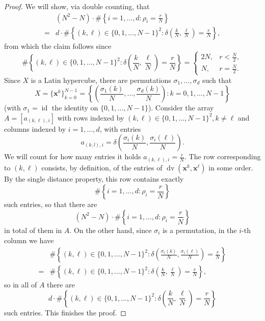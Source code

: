 \documentclass[a4paper,12pt]{article}
\numberwithin{equation}{section}
\theoremstyle{definition}
\newcommand{\bx}{\mathbf{x}}
\newcommand{\dv}{\operatorname{dv}}
\newcommand{\id}{\operatorname{id}}
\begin{document}
\begin{proof}
    We will show, via double counting, that
    \begin{align*}
        & (N^2-N) \cdot \#\left\{i=1, \dots, d: \rho_i = \frac rN\right\} \\
        = & d \cdot \#\left\{(k, \ell) \in \{0, 1, \dots, N-1\}^2: \delta\left(\frac kN, \frac \ell N\right) = \frac rN\right\},
    \end{align*}
    from which the claim follows since
    $$
    \#\left\{(k, \ell) \in \{0, 1, \dots, N-1\}^2: \delta\left(\frac kN, \frac \ell N\right) = \frac rN\right\} = \begin{cases}
        2N, &  r < \frac N2, \\
        N ,&  r = \frac N2.
    \end{cases}
    $$
    Since $X$ is a Latin hypercube, there are permutations $\sigma_1, \dots, \sigma_d$ %
    such that %
    $$
    X = \{\bx^k\}_{k=0}^{N-1} = \left\{\left(\frac{\sigma_1(k)}N, \dots, \frac{\sigma_d(k)}N\right): k=0, 1, \dots, N-1\right\}
    $$
    (with $\sigma_1 = \id$ the identity on $\{0, 1, \dots, N-1\}$). Consider the array $A = [a_{(k, \ell), i}]$ with rows indexed by $(k, \ell) \in \{0, 1, \dots, N-1\}^2, k \neq \ell$ and columns indexed by $i=1, \dots, d$, with entries
    $$
    a_{(k, l), i} = \delta\left(\frac{\sigma_i(k)}N, \frac{\sigma_i(\ell)}N\right).
    $$
    We will count for how many entries it holds $a_{(k, \ell), i} = \frac rN$. The row corresponding to $(k, \ell)$ consists, by definition, of the entries of $\dv(\bx^k, \bx^\ell)$ in some order. By the single distance property, this row contains exactly
    $$
    \#\left\{i=1, \dots, d: \rho_i = \frac rN\right\}
    $$
    such entries, so that there are
    $$
    (N^2-N) \cdot \#\left\{i=1, \dots, d: \rho_i = \frac rN\right\}
    $$
    in total of them in $A$. On the other hand, since $\sigma_i$ is a permutation, in the $i$-th column we have
    \begin{align*}
        & \#\left\{(k, \ell) \in \{0, 1, \dots, N-1\}^2: \delta\left(\frac {\sigma_i(k)}N, \frac {\sigma_i(\ell)}N\right) = \frac rN\right\} \\
        = & \#\left\{(k, \ell) \in \{0, 1, \dots, N-1\}^2: \delta\left(\frac {k}N, \frac {\ell}N\right) = \frac rN\right\},
    \end{align*}
    so in all of $A$ there are
    $$
    d \cdot \#\left\{(k, \ell) \in \{0, 1, \dots, N-1\}^2: \delta\left(\frac {k}N, \frac {\ell}N\right) = \frac rN\right\}
    $$
    such entries. This finishes the proof.
\end{proof}
\end{document}
